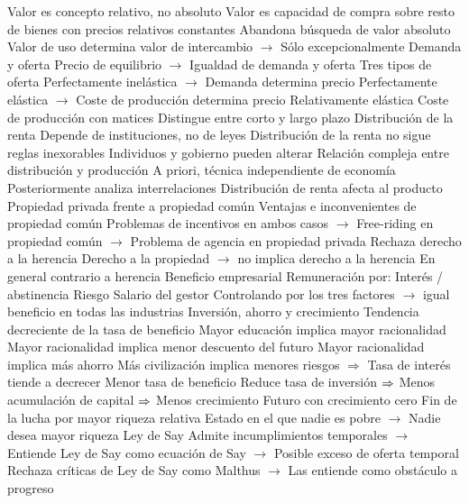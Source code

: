 \documentclass{nuevotema}
\begin{document}
\begin{esquemal}
			\3 Valor es concepto relativo, no absoluto
				\4 Valor es capacidad de compra
				\4[] sobre resto de bienes
				\4[] con precios relativos constantes
				\4 Abandona búsqueda de valor absoluto
				\4 Valor de uso determina valor de intercambio
				\4[] $\to$ Sólo excepcionalmente
			\3 Demanda y oferta
				\4 Precio de equilibrio
				\4[] $\to$ Igualdad de demanda y oferta
				\4 Tres tipos de oferta
				\4[i] Perfectamente inelástica
				\4[] $\to$ Demanda determina precio
				\4[ii] Perfectamente elástica
				\4[] $\to$ Coste de producción determina precio
				\4[iii] Relativamente elástica
				\4[] Coste de producción con matices
				\4 Distingue entre corto y largo plazo
		\2 Distribución de la renta
			\3 Depende de instituciones, no de leyes
				\4 Distribución de la renta no sigue reglas inexorables
				\4[$\to$] Individuos y gobierno pueden alterar
				\4 Relación compleja entre distribución y producción
				\4[] A priori, técnica independiente de economía
				\4[] Posteriormente analiza interrelaciones
				\4[] Distribución de renta afecta al producto
			\3 Propiedad privada frente a propiedad común
				\4 Ventajas e inconvenientes de propiedad común
				\4 Problemas de incentivos en ambos casos
				\4[] $\to$ Free-riding en propiedad común
				\4[] $\to$ Problema de agencia en propiedad privada
			\3 Rechaza derecho a la herencia
				\4 Derecho a la propiedad
				\4[] $\to$ no implica derecho a la herencia
				\4 En general contrario a herencia
			\3 Beneficio empresarial
				\4 Remuneración por:
				\4[] Interés / abstinencia
				\4[] Riesgo
				\4[] Salario del gestor
				\4 Controlando por los tres factores
				\4[] $\to$ igual beneficio en todas las industrias
		\2 Inversión, ahorro y crecimiento
			\3 Tendencia decreciente de la tasa de beneficio
				\4 Mayor educación implica mayor racionalidad
				\4 Mayor racionalidad implica menor descuento del futuro
				\4 Mayor racionalidad implica más ahorro
				\4 Más civilización implica menores riesgos
				\4[] $\Rightarrow$ Tasa de interés tiende a decrecer
				\4 Menor tasa de beneficio
				\4[] Reduce tasa de inversión
				\4[] $\Rightarrow$ Menos acumulación de capital
				\4[] $\Rightarrow$ Menos crecimiento
			\3 Futuro con crecimiento cero
				\4 Fin de la lucha por mayor riqueza relativa
				\4 Estado en el que nadie es pobre
				\4[] $\to$ Nadie desea mayor riqueza
			\3 Ley de Say
				\4 Admite incumplimientos temporales
				\4[] $\to$ Entiende Ley de Say como ecuación de Say
				\4[] $\to$ Posible exceso de oferta temporal
				\4 Rechaza críticas de Ley de Say como Malthus
				\4[] $\to$ Las entiende como obstáculo a progreso

\end{esquemal}
\end{document}
